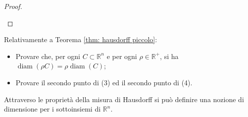 \begin{proof}
\begin{enumerate}
  \end{enumerate}
\end{proof}

\begin{exc}Relativamente a Teorema \ref{thm: hausdorff piccolo}:

\begin{itemize}
  \item Provare che, per ogni $C \subset \mathbb{R}^{n}$ e per ogni $\rho \in \mathbb{R}^{+}$, si ha $\operatorname{diam}(\rho C)=\rho \operatorname{diam}(C)$;

  \item Provare il secondo punto di (3) ed il secondo punto di (4).
\end{itemize}
\end{exc}
\noindent Attraverso le proprietà della misura di Hausdorff si può definire una nozione di dimensione per i sottoinsiemi di $\mathbb{R}^{n}$.


